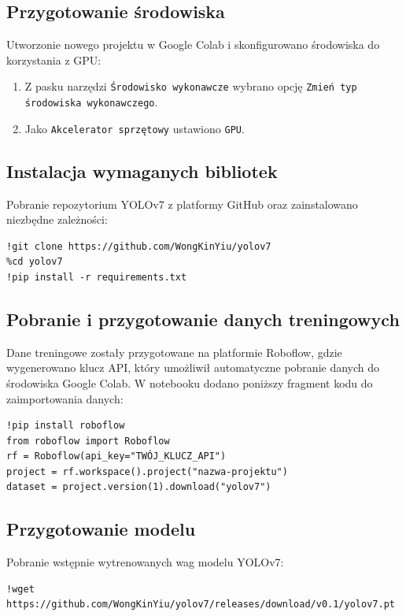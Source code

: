 \documentclass[a4paper,twoside,12pt]{book}
\begin{document}
\subsection{Przygotowanie środowiska}
Utworzonie nowego projektu w Google Colab i skonfigurowano środowiska do korzystania z GPU:
\begin{enumerate}
    \item Z pasku narzędzi \texttt{Środowisko wykonawcze} wybrano opcję \texttt{Zmień typ środowiska wykonawczego}.
    \item Jako \texttt{Akcelerator sprzętowy} ustawiono \texttt{GPU}.
\end{enumerate}

\subsection{Instalacja wymaganych bibliotek}
Pobranie repozytorium YOLOv7 z platformy GitHub oraz zainstalowano niezbędne zależności:
\begin{verbatim}
!git clone https://github.com/WongKinYiu/yolov7
%cd yolov7
!pip install -r requirements.txt
\end{verbatim}

\subsection{Pobranie i przygotowanie danych treningowych}
Dane treningowe zostały przygotowane na platformie Roboflow, gdzie wygenerowano klucz API, który umożliwił automatyczne pobranie danych do środowiska Google Colab. W notebooku dodano poniższy fragment kodu do zaimportowania danych:
\begin{verbatim}
!pip install roboflow
from roboflow import Roboflow
rf = Roboflow(api_key="TWÓJ_KLUCZ_API")
project = rf.workspace().project("nazwa-projektu")
dataset = project.version(1).download("yolov7")
\end{verbatim}

\subsection{Przygotowanie modelu}
Pobranie wstępnie wytrenowanych wag modelu YOLOv7:
\begin{verbatim}
!wget https://github.com/WongKinYiu/yolov7/releases/download/v0.1/yolov7.pt
\end{verbatim}
\end{document}
